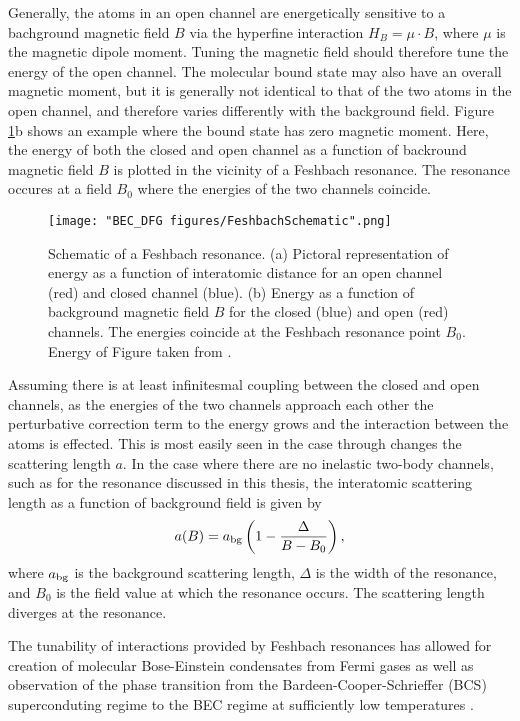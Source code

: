 Generally, the atoms in an open channel are energetically sensitive to a bachground magnetic field $B$ via the hyperfine interaction $H_B=\mu\cdot B$, where $\mu$ is the magnetic dipole moment. Tuning the magnetic field should therefore tune the energy of the open channel. The molecular bound state may also have an overall magnetic moment, but it is generally not identical to that of the two atoms in the open channel, and therefore varies differently with the background field. Figure \ref{fig:FeshbachSchematic}b shows an example where the bound state has zero magnetic moment. Here, the energy of both the closed and open channel as a function of backround magnetic field $B$ is plotted in the vicinity of a Feshbach resonance. The resonance occures at a field $B_0$ where the energies of the two channels coincide.

\begin{figure}
	\texttt{[image: "BEC\_DFG figures/FeshbachSchematic".png]}
\caption[Schematic of a Feshbach resonance]{Schematic of a Feshbach resonance. (a) Pictoral representation of energy as a function of interatomic distance for an open channel (red) and closed channel (blue). (b) Energy as a function of background magnetic field $B$ for the closed (blue) and open (red) channels. The energies coincide at the Feshbach resonance point $B_0$. Energy of Figure taken from \cite{KetterleDFG}.}
\label{fig:FeshbachSchematic}
\end{figure}

Assuming there is at least infinitesmal coupling between the closed and open channels, as the energies of the two channels approach each other the perturbative correction term to the energy grows and the interaction between the atoms is effected. This is most easily seen in the \swave{} case through changes the scattering length $a$. In the case where there are no inelastic two-body channels, such as for the \K{} resonance discussed in this thesis, the interatomic scattering length as a function of background field is given by\cite{Chin10}
\begin{equation}
a(B)=a_{\rm{bg}}\left(1-\frac{\Delta}{B-B_0}\right),
\label{eqn:feshbach}
\end{equation}
where $a_{\rm{bg}}$ is the background scattering length, $\Delta$ is the width of the resonance, and $B_0$ is the field value at which the resonance occurs. The scattering length diverges at the resonance.

The tunability of interactions provided by Feshbach resonances has allowed for creation of molecular Bose-Einstein condensates from Fermi gases \cite{Greiner03,Zwierlein03, Jochim03} as well as observation of the phase transition from the Bardeen-Cooper-Schrieffer (BCS) superconduting regime to the BEC regime at sufficiently low temperatures \cite{Bartenstein04, Bourdel04, Zwierlein04, Regal04}.

